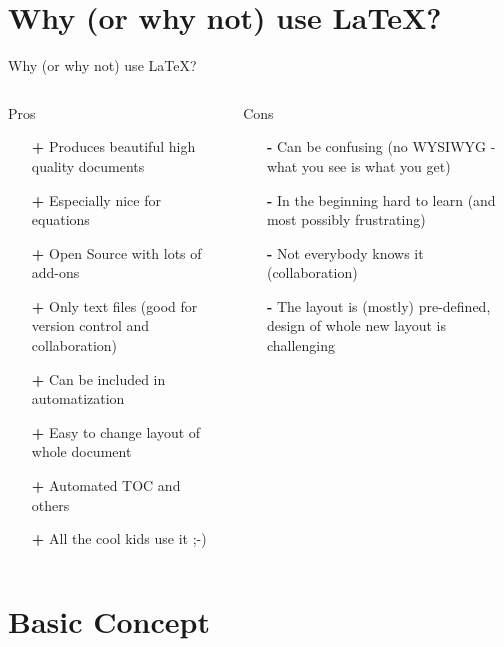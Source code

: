 \documentclass[presentation, aspectratio=1610]{beamer}
\begin{document}
\section{Why (or why not) use \LaTeX ?}
\begin{frame}{Why (or why not) use \LaTeX ?}
  \begin{columns}[t]
    \begin{block}{Pros}
    \begin{itemize}
      \item [\textbf{+}] Produces beautiful high quality documents
      \item [\textbf{+}] Especially nice for equations
      \item [\textbf{+}] Open Source with lots of add-ons
      \item [\textbf{+}] Only text files (good for version control and collaboration)
      \item [\textbf{+}] Can be included in automatization
      \item [\textbf{+}] \color{gray} Easy to change layout of whole document
      \item [\textbf{+}] Automated TOC and others
      \item [\textbf{+}] All the cool kids use it ;-)
    \end{itemize}
  \end{block}
    \pause
    \begin{alertblock}{Cons}
    \begin{itemize}
      \item [\textbf{-}] Can be confusing (no WYSIWYG - what you see is what you get)
      \item [\textbf{-}] In the beginning hard to learn (and most possibly frustrating)
      \item [\textbf{-}] Not everybody knows it (collaboration)
      \item [\textbf{-}] The layout is (mostly) pre-defined, design of whole new
        layout is challenging
    \end{itemize}
    \end{alertblock}
  \end{columns}
\end{frame}

\section{Basic Concept}
\end{document}
